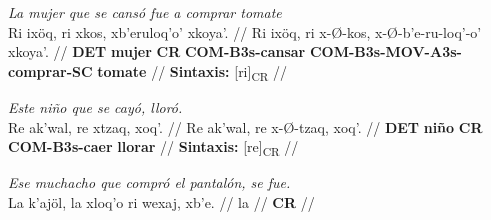 \documentclass{article}%
\begin{document}
%
\par\medskip%
\ex
\textit{La mujer que se cansó fue a comprar tomate} \\
\begingl
\gla Ri ixöq, ri xkos, xb'eruloq'o' xkoya'. //
\glb Ri ixöq, ri x-Ø-kos, x-Ø-b'e-ru-loq'-o' xkoya'. //
\glc \textbf{DET} \textbf{mujer} \textbf{CR} \textbf{COM-}\textbf{B3s-}\textbf{cansar} \textbf{COM-}\textbf{B3s-}\textbf{MOV-}\textbf{A3s-}\textbf{comprar-}\textbf{SC} \textbf{tomate} //
\glft \textbf{Sintaxis:} [ri]\textsubscript{CR} //
\endgl
\xe
%
\medskip%
\par\medskip%
\ex
\textit{Este niño que se cayó, lloró.} \\
\begingl
\gla Re ak'wal, re xtzaq, xoq'. //
\glb Re ak'wal, re x-Ø-tzaq, xoq'. //
\glc \textbf{DET} \textbf{niño} \textbf{CR} \textbf{COM-}\textbf{B3s-}\textbf{caer} \textbf{llorar} //
\glft \textbf{Sintaxis:} [re]\textsubscript{CR} //
\endgl
\xe
%
\medskip%
\par\medskip%
\ex
\textit{Ese muchacho que compró el pantalón, se fue.} \\
\begingl
\gla La k'ajöl, la xloq'o ri wexaj, xb'e. //
\glb la //
\glc \textbf{CR} //
\endgl
\xe
%
\medskip

%
\end{document}
